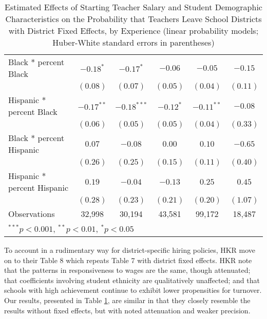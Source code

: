 \documentclass[12pt,]{article}
\begin{document}
\begin{table}
\begin{center}
\begin{tabular}{l c c c c c }
\quad Black * percent Black                 & $-0.18^{*}$  & $-0.17^{*}$   & $-0.06$     & $-0.05$      & $-0.15$      \\
                                            & $(0.08)$     & $(0.07)$      & $(0.05)$    & $(0.04)$     & $(0.11)$     \\
\quad Hispanic * percent Black              & $-0.17^{**}$ & $-0.18^{***}$ & $-0.12^{*}$ & $-0.11^{**}$ & $-0.08$      \\
                                            & $(0.06)$     & $(0.05)$      & $(0.05)$    & $(0.04)$     & $(0.33)$     \\
\quad Black * percent Hispanic              & $0.07$       & $-0.08$       & $0.00$      & $0.10$       & $-0.65$      \\
                                            & $(0.26)$     & $(0.25)$      & $(0.15)$    & $(0.11)$     & $(0.40)$     \\
\quad Hispanic * percent Hispanic           & $0.19$       & $-0.04$       & $-0.13$     & $0.25$       & $0.45$       \\
                                            & $(0.28)$     & $(0.23)$      & $(0.21)$    & $(0.20)$     & $(1.07)$     \\
\hline
Observations                                & 32,998        & 30,194         & 43,581       & 99,172        & 18,487        \\
\hline
\multicolumn{6}{l}{\scriptsize{$^{***}p<0.001$, $^{**}p<0.01$, $^*p<0.05$}}
\end{tabular}
\caption{Estimated Effects of Starting Teacher Salary and Student Demographic Characteristics on the Probability that Teachers Leave School Districts with District Fixed Effects, by Experience (linear probability models; Huber-White standard errors in parentheses)}
\label{tbl:reg_lpm_fe}
\end{center}
\end{table}

To account in a rudimentary way for district-specific hiring policies,
HKR move on to their Table 8 which repeats Table 7 with district fixed
effects. HKR note that the patterns in responsiveness to wages are the
same, though attenuated; that coefficients involving student ethnicity
are qualitatively unaffected; and that schools with high achievement
continue to exhibit lower propensities for turnover. Our results,
presented in Table \ref{tbl:reg_lpm_fe}, are similar in that they
closely resemble the results without fixed effects, but with noted
attenuation and weaker precision.
\end{document}
